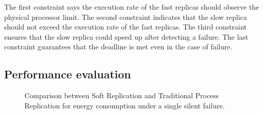 The first constraint says the execution rate of the fast replicas should observe the physical processor limit. The second constraint indicates that the slow replica should not exceed the execution rate of the fast replicas. The third constraint ensures that the slow replica could speed up after detecting a failure. The last constraint guarantees that the deadline is met even in the case of failure.



\subsection{Performance evaluation}

\begin{figure}[!t]
	\begin{center}
	\end{center}
	\caption{Comparison between Soft Replication and Traditional Process Replication for energy consumption under a single silent failure.}
	\label{fig:silent_eval}
\end{figure}




